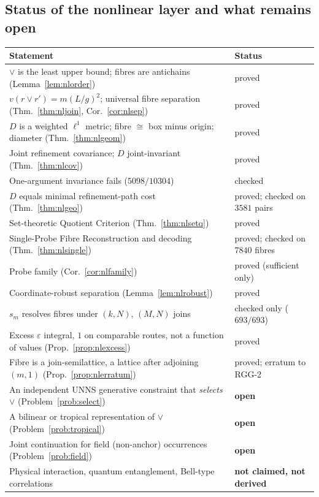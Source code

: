 \documentclass[11pt,a4paper]{article}
\newcommand{\vj}{\mathbin{\vee}}
\theoremstyle{plain}
\theoremstyle{definition}
\begin{document}
\subsection{Status of the nonlinear layer and what remains open}\label{sec:nlstatus}
\begin{center}\small
\begin{tabularx}{\textwidth}{@{}>{\raggedright\arraybackslash}X>{\raggedright\arraybackslash}p{}@{}}
\toprule
Statement & Status\\
\midrule
$\vj$ is the least upper bound; fibres are antichains (Lemma~\ref{lem:nlorder}) & proved\\
$v(r\vj r')=m(L/g)^2$; universal fibre separation (Thm.~\ref{thm:nljoin}, Cor.~\ref{cor:nlsep}) & proved\\
$D$ is a weighted $\ell^1$ metric; fibre $\cong$ box minus origin; diameter (Thm.~\ref{thm:nlgeom}) & proved\\
Joint refinement covariance; $D$ joint-invariant (Thm.~\ref{thm:nlcov}) & proved\\
One-argument invariance fails ($5098/10304$) & checked\\
$D$ equals minimal refinement-path cost (Thm.~\ref{thm:nlgeo}) & proved; checked on $3581$ pairs\\
Set-theoretic Quotient Criterion (Thm.~\ref{thm:nlsetq}) & proved\\
Single-Probe Fibre Reconstruction and decoding (Thm.~\ref{thm:nlsingle}) & proved; checked on $7840$ fibres\\
Probe family (Cor.~\ref{cor:nlfamily}) & proved (sufficient only)\\
Coordinate-robust separation (Lemma~\ref{lem:nlrobust}) & proved\\
$s_m$ resolves fibres under $(k,N)$, $(M,N)$ joins & checked only ($693/693$)\\
Excess $\varepsilon$ integral, $1$ on comparable routes, not a function of values (Prop.~\ref{prop:nlexcess}) & proved\\
Fibre is a join-semilattice, a lattice after adjoining $(m,1)$ (Prop.~\ref{prop:nlerratum}) & proved; erratum to RGG-2\\
An independent UNNS generative constraint that \emph{selects} $\vj$ (Problem~\ref{prob:select}) & \textbf{open}\\
A bilinear or tropical representation of $\vj$ (Problem~\ref{prob:tropical}) & \textbf{open}\\
Joint continuation for field (non-anchor) occurrences (Problem~\ref{prob:field}) & \textbf{open}\\
Physical interaction, quantum entanglement, Bell-type correlations & \textbf{not claimed, not derived}\\
\bottomrule
\end{tabularx}
\end{center}
\end{document}
